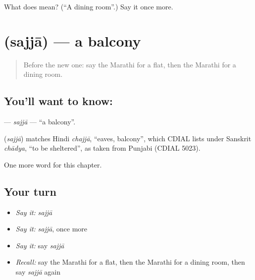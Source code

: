 \begin{tcolorbox}[breakable,colback=teal!4,colframe=teal!35!black,title={Before you move on}]
What does  mean? (\textquotedblleft{}A dining room\textquotedblright{}.) Say it once more.
\end{tcolorbox}
\section[\texorpdfstring{\mr{सज्जा} (sajjā)}{सज्जा (sajjā)}]{ (sajjā) — a balcony}

\label{lesson:MR-C178-sajja}



\begin{quote}
Before the new one: say the Marathi for a flat, then the Marathi for a dining room.
\end{quote}

\subsection*{You'll want to know: }
\textbf{} — \emph{sajjā} — \textquotedblleft{}a balcony\textquotedblright{}.

\begin{cousinweb}
\textbf{} (\emph{sajjā}) matches Hindi \emph{chajjā}, \textquotedblleft{}eaves, balcony\textquotedblright{}, which CDIAL lists under Sanskrit \emph{chādya}, \textquotedblleft{}to be sheltered\textquotedblright{}, as taken from Punjabi (CDIAL 5023).
\end{cousinweb}

\begin{grammarlens}[title={What you've built}]
One more word for this chapter.
\end{grammarlens}

\subsection*{Your turn}
\begin{itemize}
\raggedright
  \item \emph{Say it:} \emph{sajjā}
  \item \emph{Say it:} \emph{sajjā}, once more
  \item \emph{Say it:} say \emph{sajjā}
  \item \emph{Recall:} say the Marathi for a flat, then the Marathi for a dining room, then say \emph{sajjā} again
\end{itemize}

